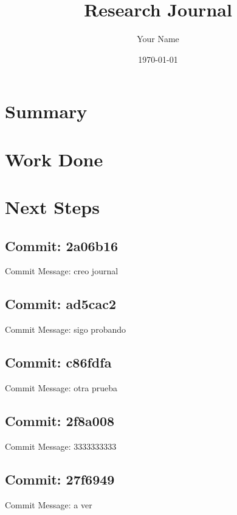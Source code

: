 \documentclass{article}
\begin{document}
\title{Research Journal}
\author{Your Name}
\date{\today}

\maketitle

\section{Summary}

\section{Work Done}

\section{Next Steps}


\subsection{Commit: 2a06b16}

Commit Message: creo journal


\subsection{Commit: ad5cac2}

Commit Message: sigo probando


\subsection{Commit: c86fdfa}

Commit Message: otra prueba


\subsection{Commit: 2f8a008}

Commit Message: 3333333333


\subsection{Commit: 27f6949}

Commit Message: a ver
\end{document}
